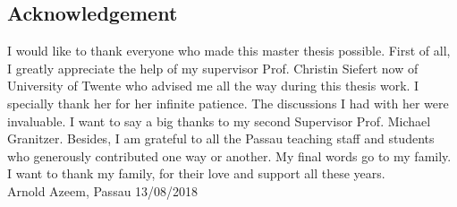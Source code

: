 \begin{titlepage}
\begin{abstract}
\end{abstract}

\section*{Acknowledgement}
I would like to thank everyone who made this master thesis possible. First of all, I greatly appreciate the help of my supervisor Prof. Christin Siefert now of University of Twente who advised me all the way during this thesis work. I specially thank her for her infinite patience. The discussions I had with her were invaluable.
I want to say a big thanks to my second Supervisor Prof. Michael Granitzer. Besides, I am grateful to all the Passau teaching staff and students who generously
contributed one way or another.
My final words go to my family. I want to thank my family, for their love and support all
these years.\\
Arnold Azeem, Passau 13/08/2018

\end{titlepage}